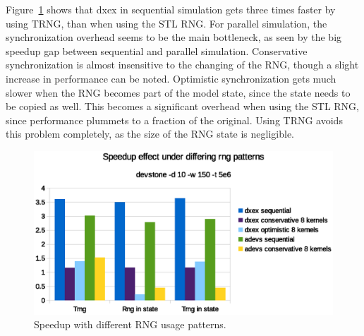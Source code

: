 Figure~\ref{fig:Queuerngspeedup} shows that dxex in sequential simulation gets three times faster by using TRNG, than when using the STL RNG.
For parallel simulation, the synchronization overhead seems to be the main bottleneck, as seen by the big speedup gap between sequential and parallel simulation.
Conservative synchronization is almost insensitive to the changing of the RNG, though a slight increase in performance can be noted.
Optimistic synchronization gets much slower when the RNG becomes part of the model state, since the state needs to be copied as well.
This becomes a significant overhead when using the STL RNG, since performance plummets to a fraction of the original.
Using TRNG avoids this problem completely, as the size of the RNG state is negligible.

\begin{figure}
    \center
    \includegraphics[width=\modelfraction\columnwidth]{fig/rngspeedupeffectdevstone.eps}
    \caption{Speedup with different RNG usage patterns.}
    \label{fig:Queuerngspeedup}
\end{figure}
